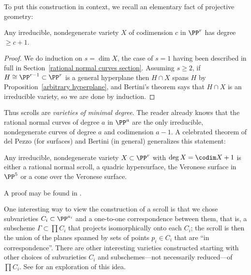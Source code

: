 
To put this construction in context, we recall an elementary fact of projective geometry:
 
\begin{proposition}\label{minimal degree}
 Any irreducible, nondegenerate variety $X$ of codimension $c$ in $\PP^{r}$ has degree $\geq c +1$.
\end{proposition}

\begin{proof} We do induction on $s = \dim X$, the case of $s=1$ having been described in full in Section~\ref{rational normal curves section}. Assuming $s \geq 2$, if $H\cong \PP^{r-1}\subset \PP^r$ is a general hyperplane then $H\cap X$ spans
$H$ by Proposition~\ref{arbitrary hyperplane}, and  Bertini's theorem says that $H\cap X$ is  an irreducible variety, so we are done by induction. 
 \end{proof}

Thus scrolls are \emph{varieties of minimal degree}. The reader already knows that the rational normal curves of degree $a$ in $\PP^{a}$ are the only irreducible, nondegenerate curves of degree $a$ and codimension $a-1$. A celebrated theorem of del Pezzo (for surfaces) and Bertini (in general) generalizes this statement:

\begin{fact}\label{classification of scrolls} 
Any irreducible, nondegenerate variety $X\subset \PP^{r}$  with $\deg X = \codim X+1$ is either a rational normal scroll, a quadric hypersurface, the Veronese surface in $\PP^{5}$ or a cone over the Veronese surface.
\end{fact}

A proof may be found in \cite{Eisenbud-Harris-Centennial}.

One interesting way to view the construction of a scroll is that we chose subvarieties $C_{i}\subset \PP^{a_{i}}$ and a one-to-one correspondence between them, that is, a subscheme
$\Gamma\subset \prod C_{i}$ that projects isomorphically onto each $C_{i}$; the scroll is then the
union of the planes spanned by sets of points $p_{i}\in C_{i}$ that are ``in correspondence''. There are other interesting varieties constructed starting with other choices of subvarieties $C_{i}$ and subschemes---not necessarily reduced---of $\prod C_{i}$. See \cite{Eisenbud-Sammartano} for an exploration of this idea.

